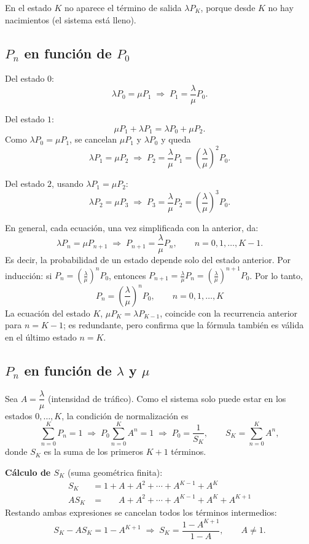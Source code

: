 \documentclass[12pt]{article}
\begin{document}
En el estado $K$ no aparece el término de salida $\lambda P_K$, porque desde $K$ no hay nacimientos (el sistema está lleno).

\subsection{$P_n$ en función de $P_0$}

Del estado $0$:
\[
\lambda P_0=\mu P_1 \;\Rightarrow\; P_1=\frac{\lambda}{\mu}P_0 .
\]

Del estado $1$:
\[
\mu P_1+\lambda P_1=\lambda P_0+\mu P_2 .
\]
Como $\lambda P_0=\mu P_1$, se cancelan $\mu P_1$ y $\lambda P_0$ y queda
\[
\lambda P_1=\mu P_2 \;\Rightarrow\; P_2=\frac{\lambda}{\mu}P_1=\left(\frac{\lambda}{\mu}\right)^2P_0 .
\]

Del estado $2$, usando $\lambda P_1=\mu P_2$:
\[
\lambda P_2=\mu P_3 \;\Rightarrow\; P_3=\frac{\lambda}{\mu}P_2=\left(\frac{\lambda}{\mu}\right)^3P_0 .
\]

En general, cada ecuación, una vez simplificada con la anterior, da:
\[
\lambda P_n=\mu P_{n+1}\;\Rightarrow\; P_{n+1}=\frac{\lambda}{\mu}P_n,\qquad n=0,1,\dots,K-1 .
\]
Es decir, la probabilidad de un estado depende solo del estado anterior. Por inducción: si $P_n=\left(\frac{\lambda}{\mu}\right)^nP_0$, entonces $P_{n+1}=\frac{\lambda}{\mu}P_n=\left(\frac{\lambda}{\mu}\right)^{n+1}P_0$. Por lo tanto,
\[
\boxed{P_n=\left(\frac{\lambda}{\mu}\right)^{n}P_0,\qquad n=0,1,\dots,K}
\]
La ecuación del estado $K$, $\mu P_K=\lambda P_{K-1}$, coincide con la recurrencia anterior para $n=K-1$; es redundante, pero confirma que la fórmula también es válida en el último estado $n=K$.

\subsection{$P_n$ en función de $\lambda$ y $\mu$}

Sea $A=\dfrac{\lambda}{\mu}$ (intensidad de tráfico). Como el sistema solo puede estar en los estados $0,\dots,K$, la condición de normalización es
\[
\sum_{n=0}^{K}P_n=1
\;\Rightarrow\;
P_0\sum_{n=0}^{K}A^n=1
\;\Rightarrow\;
P_0=\frac{1}{S_K},\qquad S_K=\sum_{n=0}^{K}A^n ,
\]
donde $S_K$ es la suma de los primeros $K+1$ términos.

\textbf{Cálculo de $S_K$} (suma geométrica finita):
\begin{align*}
S_K &= 1+A+A^2+\cdots+A^{K-1}+A^K \\
AS_K &= \phantom{1+{}}A+A^2+\cdots+A^{K-1}+A^K+A^{K+1}
\end{align*}
Restando ambas expresiones se cancelan todos los términos intermedios:
\[
S_K-AS_K=1-A^{K+1}\;\Rightarrow\;S_K=\frac{1-A^{K+1}}{1-A},\qquad A\neq 1 .
\]
\end{document}
